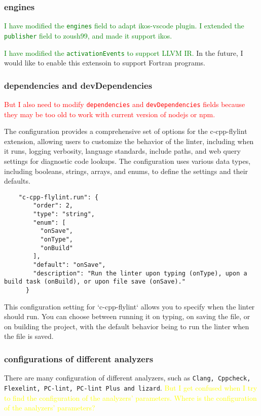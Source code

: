 \documentclass[12pt]{article}
\begin{document}
\subsubsection{engines}
\textcolor{green}{I have modified the \texttt{engines} field to adapt ikos-vscode plugin. I extended the \texttt{publisher} field to zoush99, and made it support ikos.}

\textcolor{green}{I have modified the \texttt{activationEvents} to support LLVM IR.} In the future, I would like to enable this extensoin to support Fortran programs.

\subsubsection{dependencies and devDependencies}
\textcolor{red}{But I also need to modify \texttt{dependencies} and \texttt{devDependencies} fields because they may be too old to work with current version of nodejs or npm.}

The configuration provides a comprehensive set of options for the c-cpp-flylint extension, allowing users to customize the behavior of the linter, including when it runs, logging verbosity, language standards, include paths, and web query settings for diagnostic code lookups. The configuration uses various data types, including booleans, strings, arrays, and enums, to define the settings and their defaults.

\begin{lstlisting}
    "c-cpp-flylint.run": {
        "order": 2,
        "type": "string",
        "enum": [
          "onSave",
          "onType",
          "onBuild"
        ],
        "default": "onSave",
        "description": "Run the linter upon typing (onType), upon a build task (onBuild), or upon file save (onSave)."
      }
\end{lstlisting}

This configuration setting for `c-cpp-flylint` allows you to specify when the linter should run. You can choose between running it on typing, on saving the file, or on building the project, with the default behavior being to run the linter when the file is saved.

\subsubsection{configurations of different analyzers}
There are many configuration of different analyzers, such as \texttt{Clang, Cppcheck, Flexelint, PC-lint, PC-lint Plus and lizard}. \textcolor{yellow}{But I get confused when I try to find the configuration of the analyzers' parameters. Where is the configuration of the analyzers' parameters?}
\end{document}
